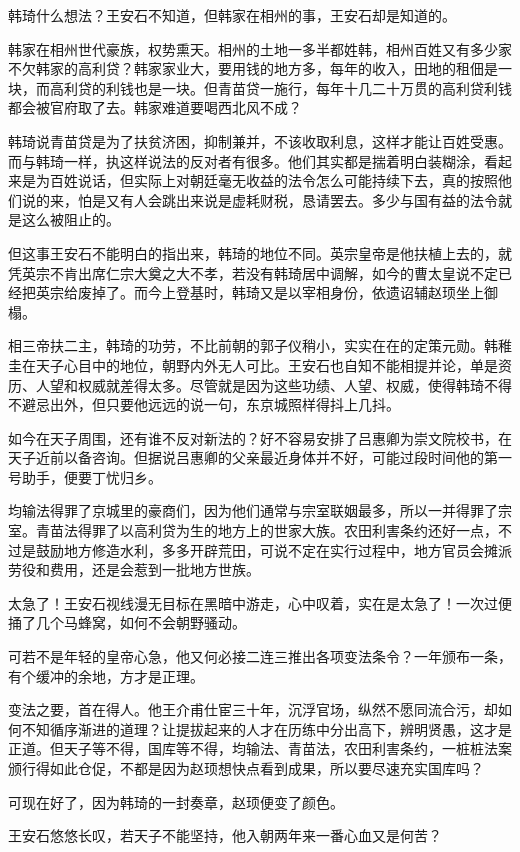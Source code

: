 韩琦什么想法？王安石不知道，但韩家在相州的事，王安石却是知道的。

韩家在相州世代豪族，权势熏天。相州的土地一多半都姓韩，相州百姓又有多少家不欠韩家的高利贷？韩家家业大，要用钱的地方多，每年的收入，田地的租佃是一块，而高利贷的利钱也是一块。但青苗贷一施行，每年十几二十万贯的高利贷利钱都会被官府取了去。韩家难道要喝西北风不成？

韩琦说青苗贷是为了扶贫济困，抑制兼并，不该收取利息，这样才能让百姓受惠。而与韩琦一样，执这样说法的反对者有很多。他们其实都是揣着明白装糊涂，看起来是为百姓说话，但实际上对朝廷毫无收益的法令怎么可能持续下去，真的按照他们说的来，怕是又有人会跳出来说是虚耗财税，恳请罢去。多少与国有益的法令就是这么被阻止的。

但这事王安石不能明白的指出来，韩琦的地位不同。英宗皇帝是他扶植上去的，就凭英宗不肯出席仁宗大奠之大不孝，若没有韩琦居中调解，如今的曹太皇说不定已经把英宗给废掉了。而今上登基时，韩琦又是以宰相身份，依遗诏辅赵顼坐上御榻。

相三帝扶二主，韩琦的功劳，不比前朝的郭子仪稍小，实实在在的定策元勋。韩稚圭在天子心目中的地位，朝野内外无人可比。王安石也自知不能相提并论，单是资历、人望和权威就差得太多。尽管就是因为这些功绩、人望、权威，使得韩琦不得不避忌出外，但只要他远远的说一句，东京城照样得抖上几抖。

如今在天子周围，还有谁不反对新法的？好不容易安排了吕惠卿为崇文院校书，在天子近前以备咨询。但据说吕惠卿的父亲最近身体并不好，可能过段时间他的第一号助手，便要丁忧归乡。

均输法得罪了京城里的豪商们，因为他们通常与宗室联姻最多，所以一并得罪了宗室。青苗法得罪了以高利贷为生的地方上的世家大族。农田利害条约还好一点，不过是鼓励地方修造水利，多多开辟荒田，可说不定在实行过程中，地方官员会摊派劳役和费用，还是会惹到一批地方世族。

太急了！王安石视线漫无目标在黑暗中游走，心中叹着，实在是太急了！一次过便捅了几个马蜂窝，如何不会朝野骚动。

可若不是年轻的皇帝心急，他又何必接二连三推出各项变法条令？一年颁布一条，有个缓冲的余地，方才是正理。

变法之要，首在得人。他王介甫仕宦三十年，沉浮官场，纵然不愿同流合污，却如何不知循序渐进的道理？让提拔起来的人才在历练中分出高下，辨明贤愚，这才是正道。但天子等不得，国库等不得，均输法、青苗法，农田利害条约，一桩桩法案颁行得如此仓促，不都是因为赵顼想快点看到成果，所以要尽速充实国库吗？

可现在好了，因为韩琦的一封奏章，赵顼便变了颜色。

王安石悠悠长叹，若天子不能坚持，他入朝两年来一番心血又是何苦？

